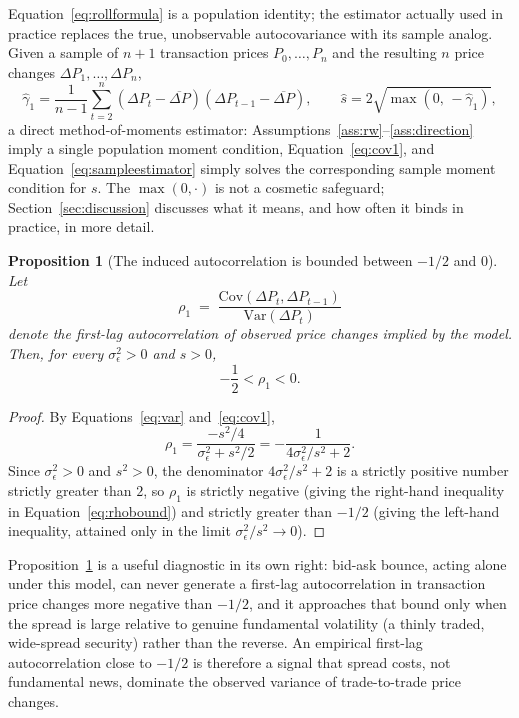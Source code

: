 \documentclass[11pt]{article}
\newtheorem{proposition}{Proposition}
\theoremstyle{remark}
\theoremstyle{definition}
\begin{document}
Equation~\eqref{eq:rollformula} is a population identity; the estimator actually used in practice replaces the true, unobservable autocovariance with its sample analog. Given a sample of $n+1$ transaction prices $P_0,\dots,P_n$ and the resulting $n$ price changes $\Delta P_1,\dots,\Delta P_n$,
\begin{equation}
\hat\gamma_1 = \frac{1}{n-1}\sum_{t=2}^{n} (\Delta P_t - \overline{\Delta P})(\Delta P_{t-1}-\overline{\Delta P}), \qquad \hat s = 2\sqrt{\max(0,\,-\hat\gamma_1)},
\label{eq:sampleestimator}
\end{equation}
a direct method-of-moments estimator: Assumptions~\ref{ass:rw}--\ref{ass:direction} imply a single population moment condition, Equation~\eqref{eq:cov1}, and Equation~\eqref{eq:sampleestimator} simply solves the corresponding sample moment condition for $s$. The $\max(0,\cdot)$ is not a cosmetic safeguard; Section~\ref{sec:discussion} discusses what it means, and how often it binds in practice, in more detail.

\begin{proposition}[The induced autocorrelation is bounded between $-1/2$ and $0$]
\label{prop:bound}
Let
\begin{equation*}
\rho_1 \;=\; \frac{\mathrm{Cov}(\Delta P_t,\Delta P_{t-1})}{\mathrm{Var}(\Delta P_t)}
\end{equation*}
denote the first-lag autocorrelation of observed price changes implied by the model. Then, for every $\sigma_\epsilon^2>0$ and $s>0$,
\begin{equation}
-\frac{1}{2} < \rho_1 < 0.
\label{eq:rhobound}
\end{equation}
\end{proposition}
\begin{proof}
By Equations~\eqref{eq:var} and~\eqref{eq:cov1},
\begin{equation}
\rho_1 = \frac{-s^2/4}{\sigma_\epsilon^2 + s^2/2} = -\frac{1}{4\sigma_\epsilon^2/s^2 + 2}.
\end{equation}
Since $\sigma_\epsilon^2>0$ and $s^2>0$, the denominator $4\sigma_\epsilon^2/s^2+2$ is a strictly positive number strictly greater than $2$, so $\rho_1$ is strictly negative (giving the right-hand inequality in Equation~\eqref{eq:rhobound}) and strictly greater than $-1/2$ (giving the left-hand inequality, attained only in the limit $\sigma_\epsilon^2/s^2\to0$).
\end{proof}

Proposition~\ref{prop:bound} is a useful diagnostic in its own right: bid-ask bounce, acting alone under this model, can never generate a first-lag autocorrelation in transaction price changes more negative than $-1/2$, and it approaches that bound only when the spread is large relative to genuine fundamental volatility (a thinly traded, wide-spread security) rather than the reverse. An empirical first-lag autocorrelation close to $-1/2$ is therefore a signal that spread costs, not fundamental news, dominate the observed variance of trade-to-trade price changes.
\end{document}
